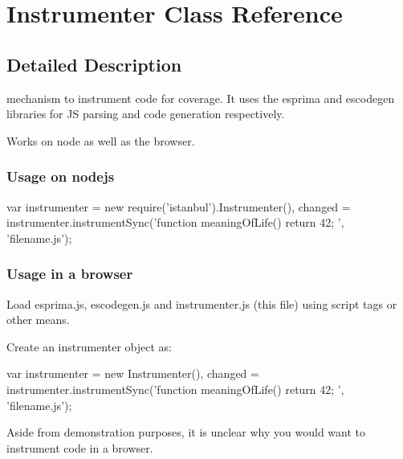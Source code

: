 \hypertarget{class_instrumenter}{}\section{Instrumenter Class Reference}
\label{class_instrumenter}


\subsection{Detailed Description}
mechanism to instrument code for coverage. It uses the {\ttfamily esprima} and {\ttfamily escodegen} libraries for J\+S parsing and code generation respectively.

Works on {\ttfamily node} as well as the browser.

\subsubsection*{Usage on nodejs }

\begin{DoxyVerb} var instrumenter = new require('istanbul').Instrumenter(),
     changed = instrumenter.instrumentSync('function meaningOfLife() { return 42; }', 'filename.js');
\end{DoxyVerb}


\subsubsection*{Usage in a browser }

Load {\ttfamily esprima.\+js}, {\ttfamily escodegen.\+js} and {\ttfamily instrumenter.\+js} (this file) using {\ttfamily script} tags or other means.

Create an instrumenter object as\+: \begin{DoxyVerb} var instrumenter = new Instrumenter(),
     changed = instrumenter.instrumentSync('function meaningOfLife() { return 42; }', 'filename.js');
\end{DoxyVerb}


Aside from demonstration purposes, it is unclear why you would want to instrument code in a browser.


